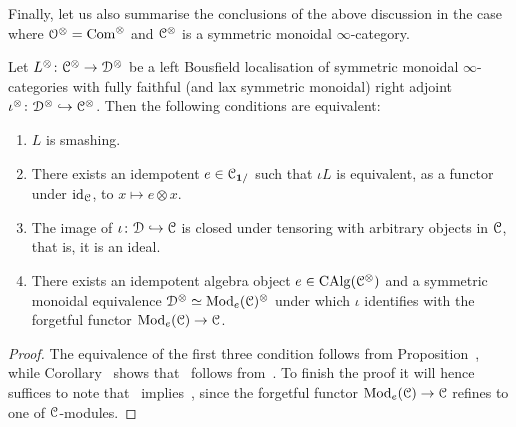 Finally, let us also summarise the conclusions of the above discussion in the case where $\mathcal{O}^{\otimes} = \mathrm{Com}^\otimes$ and $\mathcal C^{\otimes}$ is a symmetric monoidal $\infty$-category.

\begin{corollary}
\label{corollary:smashing-symmetric-monoidal}%
Let $L^{\otimes} \colon \mathcal C^{\otimes} \to \mathcal{D}^{\otimes}$ be a left Bousfield localisation of symmetric monoidal $\infty$-categories with fully faithful (and lax symmetric monoidal) right adjoint $\iota^{\otimes}\colon \mathcal{D}^{\otimes} \hookrightarrow \mathcal C^{\otimes}$.
Then the following conditions are equivalent:
\begin{enumerate}
\item
\label{item:counit-tensor}%
$L$ is smashing. %
\item
\label{item:left-adjoint-is-tensoring}%
There exists an idempotent $e \in \mathcal C_{\mathbf{1}/}$ such that $\iota L$ is equivalent, as a functor under $\mathrm{id}_{\mathcal C}$, to $x \mapsto e \otimes x$.
\item
\label{item:closed-under-tensoring}%
The image of $\iota\colon \mathcal{D} \hookrightarrow \mathcal C$ is closed under tensoring with arbitrary objects in $\mathcal C$, that is, it is an ideal.
\item
\label{item:smashing-as-algebra}%
There exists an idempotent algebra object $e \in \mathrm{CAlg}(\mathcal C^{\otimes})$ and a symmetric monoidal equivalence $\mathcal{D}^{\otimes} \simeq \operatorname{Mod}_e(\mathcal C)^{\otimes}$ under which $\iota$ identifies with the forgetful functor $\operatorname{Mod}_e(\mathcal C) \to \mathcal C$.
\end{enumerate}
\end{corollary}
\begin{proof}
The equivalence of the first three condition follows from Proposition~, while Corollary~ shows that~ follows from~. To finish the proof it will hence suffices to note that~ implies~, since the forgetful functor $\operatorname{Mod}_e(\mathcal C) \to \mathcal C$ refines to one of $\mathcal C$-modules. %
\end{proof}



